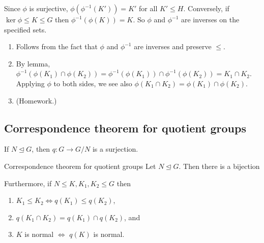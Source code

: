 \documentclass[12pt,letterpaper]{report}
\begin{document}
\begin{thmproof}
  Since $\phi$ is surjective, $\phi(\phi^{-1}(K')) = K'$ for all $K' \leq H$.
  Conversely, if $\ker\phi \leq K \leq G$ then $\phi^{-1}(\phi(K)) = K$.
  So $\phi$ and $\phi^{-1}$ are inverses on the specified sets.

  \begin{enumerate}
    \item Follows from the fact that $\phi$ and $\phi^{-1}$ are inverses and preserve $\leq$.
    \item By lemma, $\phi^{-1}(\phi(K_1) \cap \phi(K_2))
      = \phi^{-1}(\phi(K_1)) \cap \phi^{-1}(\phi(K_2)) = K_1 \cap K_2$.
      Applying $\phi$ to both sides, we see also $\phi(K_1 \cap K_2) = \phi(K_1) \cap \phi(K_2)$.
    \item (Homework.)
  \end{enumerate}
\end{thmproof}

\pagebreak
\subsection{Correspondence theorem for quotient groups}

If $N \trianglelefteq G$, then $q \colon G \to G/N$ is a surjection.

\begin{thm}{Correspondence theorem for quotient groups}{}
  Let $N \trianglelefteq G$.
  Then there is a bijection
  \begin{center}
  \end{center}
  Furthermore, if $N \leq K, K_1, K_2 \leq G$ then
  \begin{enumerate}
    \item $K_1 \leq K_2 \iff q(K_1) \leq q(K_2)$,
    \item $q(K_1 \cap K_2) = q(K_1) \cap q(K_2)$, and
    \item $K$ is normal $\iff$ $q(K)$ is normal.
  \end{enumerate}
\end{thm}
\end{document}
